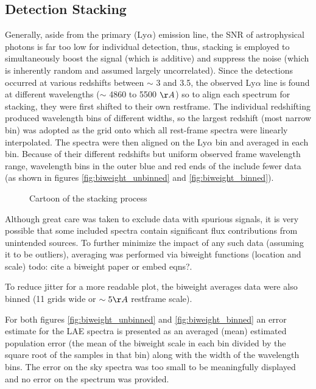 \documentclass{aastex62}
\begin{document}
\subsection{Detection Stacking}

Generally, aside from the primary (Ly$\alpha$) emission line, the SNR of astrophysical photons is far too low for individual detection, thus, stacking is employed to simultaneously boost the signal (which is additive) and suppress the noise (which is inherently random and assumed largely uncorrelated). Since the detections occurred at various redshifts between $\sim$ 3 and 3.5, the observed Ly$\alpha$ line is found at different wavelengths ($\sim$ 4860 to 5500 $\AA$) so to align each spectrum for stacking, they were first shifted to their own restframe. The individual redshifting produced wavelength bins of different widths, so the largest redshift (most narrow bin) was adopted as the grid onto which all rest-frame spectra were linearly interpolated. The spectra were then aligned on the Ly$\alpha$ bin and averaged in each bin. Because of their different redshifts but uniform observed frame wavelength range, wavelength bins in the outer blue and red ends of the include fewer data (as shown in figures \ref{fig:biweight_unbinned} and \ref{fig:biweight_binned}).

\begin{figure}[H]
\caption{Cartoon of the stacking process\label{fig:stacking cartoon}}
\end{figure}

Although great care was taken to exclude data with spurious signals, it is very possible that some included spectra contain significant flux contributions from unintended sources. To further minimize the impact of any such data (assuming it to be outliers), averaging was performed via biweight functions (location and scale) { \color{red} todo: cite a biweight paper or embed eqns?}.

To reduce jitter for a more readable plot, the biweight averages data were also binned (11 grids wide or $\sim 5 \AA$ restframe scale).

For both figures \ref{fig:biweight_unbinned} and \ref{fig:biweight_binned} an error estimate for the LAE spectra is presented as an averaged (mean) estimated population error (the mean of the biweight scale in each bin divided by the square root of the samples in that bin) along with the width of the wavelength bins. The error on the sky spectra was too small to be meaningfully displayed and no error on the \cite{Steidel} spectrum was provided.
\end{document}
